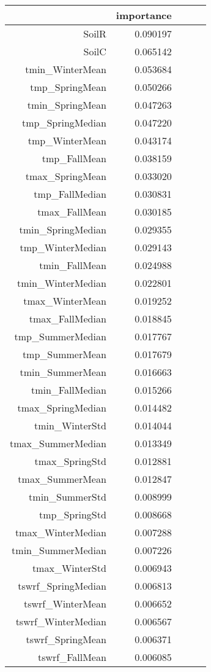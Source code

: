 \begin{tabular}{rrrrr}
\toprule
 & importance \\
\midrule
SoilR & 0.090197 \\
SoilC & 0.065142 \\
tmin_WinterMean & 0.053684 \\
tmp_SpringMean & 0.050266 \\
tmin_SpringMean & 0.047263 \\
tmp_SpringMedian & 0.047220 \\
tmp_WinterMean & 0.043174 \\
tmp_FallMean & 0.038159 \\
tmax_SpringMean & 0.033020 \\
tmp_FallMedian & 0.030831 \\
tmax_FallMean & 0.030185 \\
tmin_SpringMedian & 0.029355 \\
tmp_WinterMedian & 0.029143 \\
tmin_FallMean & 0.024988 \\
tmin_WinterMedian & 0.022801 \\
tmax_WinterMean & 0.019252 \\
tmax_FallMedian & 0.018845 \\
tmp_SummerMedian & 0.017767 \\
tmp_SummerMean & 0.017679 \\
tmin_SummerMean & 0.016663 \\
tmin_FallMedian & 0.015266 \\
tmax_SpringMedian & 0.014482 \\
tmin_WinterStd & 0.014044 \\
tmax_SummerMedian & 0.013349 \\
tmax_SpringStd & 0.012881 \\
tmax_SummerMean & 0.012847 \\
tmin_SummerStd & 0.008999 \\
tmp_SpringStd & 0.008668 \\
tmax_WinterMedian & 0.007288 \\
tmin_SummerMedian & 0.007226 \\
tmax_WinterStd & 0.006943 \\
tswrf_SpringMedian & 0.006813 \\
tswrf_WinterMean & 0.006652 \\
tswrf_WinterMedian & 0.006567 \\
tswrf_SpringMean & 0.006371 \\
tswrf_FallMean & 0.006085 \\

\end{tabular}
